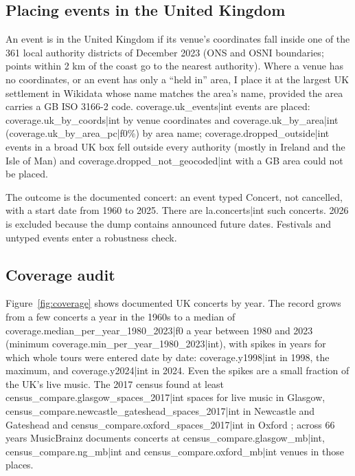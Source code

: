 \documentclass[11pt,a4paper]{article}
\begin{document}
\subsection{Placing events in the United Kingdom}
An event is in the United Kingdom if its venue's coordinates fall inside one of the 361 local authority districts of December 2023 (ONS and OSNI boundaries; points within 2 km of the coast go to the nearest authority). Where a venue has no coordinates, or an event has only a ``held in'' area, I place it at the largest UK settlement in Wikidata whose name matches the area's name, provided the area carries a GB ISO 3166-2 code. {{coverage.uk_events|int}} events are placed: {{coverage.uk_by_coords|int}} by venue coordinates and {{coverage.uk_by_area|int}} ({{coverage.uk_by_area_pc|f0}}\%) by area name; {{coverage.dropped_outside|int}} events in a broad UK box fell outside every authority (mostly in Ireland and the Isle of Man) and {{coverage.dropped_not_geocoded|int}} with a GB area could not be placed.

The outcome is the documented concert: an event typed Concert, not cancelled, with a start date from 1960 to 2025. There are {{la.concerts|int}} such concerts. 2026 is excluded because the dump contains announced future dates. Festivals and untyped events enter a robustness check.

\subsection{Coverage audit}
Figure~\ref{fig:coverage} shows documented UK concerts by year. The record grows from a few concerts a year in the 1960s to a median of {{coverage.median_per_year_1980_2023|f0}} a year between 1980 and 2023 (minimum {{coverage.min_per_year_1980_2023|int}}), with spikes in years for which whole tours were entered date by date: {{coverage.y1998|int}} in 1998, the maximum, and {{coverage.y2024|int}} in 2024. Even the spikes are a small fraction of the UK's live music. The 2017 census found at least {{census_compare.glasgow_spaces_2017|int}} spaces for live music in Glasgow, {{census_compare.newcastle_gateshead_spaces_2017|int}} in Newcastle and Gateshead and {{census_compare.oxford_spaces_2017|int}} in Oxford \citep{webster2018}; across 66 years MusicBrainz documents concerts at {{census_compare.glasgow_mb|int}}, {{census_compare.ng_mb|int}} and {{census_compare.oxford_mb|int}} venues in those places.
\end{document}
